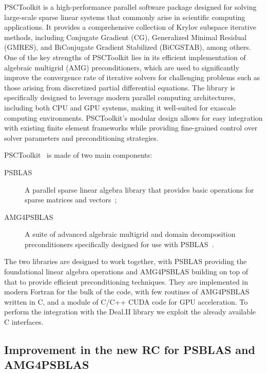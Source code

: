 \documentclass[a4paper,12pt]{article}
\begin{document}
PSCToolkit is a high-performance parallel software package designed for solving large-scale sparse linear 
systems that commonly arise in scientific computing applications. It provides a comprehensive collection 
of Krylov subspace iterative methods, including Conjugate Gradient (CG), Generalized Minimal Residual (GMRES), 
and BiConjugate Gradient Stabilized (BiCGSTAB), among others. One of the key strengths of PSCToolkit lies 
in its efficient implementation of algebraic multigrid (AMG) preconditioners, which are used to significantly 
improve the convergence rate of iterative solvers for challenging problems such as those arising from 
discretized partial differential equations. The library is specifically designed to leverage modern 
parallel computing architectures, including both CPU and GPU systems, making it well-suited for exascale 
computing environments. PSCToolkit's modular design allows for easy integration with existing finite element 
frameworks while providing fine-grained control over solver parameters and preconditioning strategies.

PSCToolkit~\cite{PSCToolkit} is made of two main components:
\begin{description}
    \item[PSBLAS] A parallel sparse linear algebra library that provides basic operations for sparse matrices and vectors~\cite{PSBLAS};
    \item[AMG4PSBLAS] A suite of advanced algebraic multigrid and domain decomposition preconditioners specifically 
    designed for use with PSBLAS~\cite{AMG4PSBLAS}.
\end{description}
The two libraries are designed to work together, with PSBLAS providing the foundational linear algebra operations 
and AMG4PSBLAS building on top of that to provide efficient preconditioning techniques.
They are implemented in modern Fortran for the bulk of the code, with few routines of AMG4PSBLAS written in C,
and a module of C/C++ CUDA code for GPU acceleration. To perform the integration with the Deal.II library we 
exploit the already available C interfaces. 

\subsection{Improvement in the new RC for PSBLAS and AMG4PSBLAS}
\end{document}
